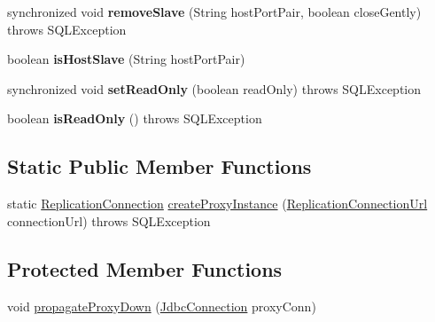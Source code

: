 \begin{DoxyCompactItemize}
synchronized void {\bfseries remove\+Slave} (String host\+Port\+Pair, boolean close\+Gently)  throws S\+Q\+L\+Exception 
\item 
\mbox{\label{classcom_1_1mysql_1_1cj_1_1jdbc_1_1ha_1_1_replication_connection_proxy_a472e2e5ad87da8c7f7129613e1bf2479}} 
boolean {\bfseries is\+Host\+Slave} (String host\+Port\+Pair)
\item 
\mbox{\label{classcom_1_1mysql_1_1cj_1_1jdbc_1_1ha_1_1_replication_connection_proxy_ad89a48fce7262137c4db844d6c6838a3}} 
synchronized void {\bfseries set\+Read\+Only} (boolean read\+Only)  throws S\+Q\+L\+Exception 
\item 
\mbox{\label{classcom_1_1mysql_1_1cj_1_1jdbc_1_1ha_1_1_replication_connection_proxy_a8fd0fe1c0d5dea93f38cc0105e1899ab}} 
boolean {\bfseries is\+Read\+Only} ()  throws S\+Q\+L\+Exception 
\end{DoxyCompactItemize}
\subsection*{Static Public Member Functions}
\begin{DoxyCompactItemize}
\item 
static \mbox{\hyperlink{interfacecom_1_1mysql_1_1cj_1_1jdbc_1_1ha_1_1_replication_connection}{Replication\+Connection}} \mbox{\hyperlink{classcom_1_1mysql_1_1cj_1_1jdbc_1_1ha_1_1_replication_connection_proxy_ae2b51d44466e63adbc4f963f0d4739d7}{create\+Proxy\+Instance}} (\mbox{\hyperlink{classcom_1_1mysql_1_1cj_1_1conf_1_1url_1_1_replication_connection_url}{Replication\+Connection\+Url}} connection\+Url)  throws S\+Q\+L\+Exception 
\end{DoxyCompactItemize}
\subsection*{Protected Member Functions}
\begin{DoxyCompactItemize}
\item 
void \mbox{\hyperlink{classcom_1_1mysql_1_1cj_1_1jdbc_1_1ha_1_1_replication_connection_proxy_ad12288bce5f6b4c6cc77f11d3dfdb176}{propagate\+Proxy\+Down}} (\mbox{\hyperlink{interfacecom_1_1mysql_1_1cj_1_1jdbc_1_1_jdbc_connection}{Jdbc\+Connection}} proxy\+Conn)
\end{DoxyCompactItemize}
